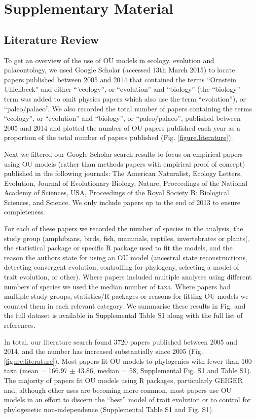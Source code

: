 \section{Supplementary Material}

  \subsection{Literature Review}
    To get an overview of the use of OU models in ecology, evolution and palaeontology, we used Google Scholar (accessed 13th March 2015) to locate papers published between 2005 \citep[when the R package ouch was released;][]{Butler:2004aa} and 2014 that contained the terms ``Ornstein Uhlenbeck'' and either ``'ecology'', or ``evolution'' and ``biology'' (the ``biology'' term was added to omit physics papers which also use the term ``evolution''), or ``paleo/palaeo''. 
    We also recorded the total number of papers containing the terms ``ecology'', or ``evolution'' and ``biology'', or ``paleo/palaeo'', published between 2005 and 2014 and plotted the number of OU papers published each year as a proportion of the total number of papers published (Fig. \ref{figure.literature}). 

    Next we filtered our Google Scholar search results to focus on empirical papers using OU models (rather than methods papers with empirical proof of concept) published in the following journals: The American Naturalist, Ecology Letters, Evolution, Journal of Evolutionary Biology, Nature, Proceedings of the National Academy of Sciences, USA, Proceedings of the Royal Society B: Biological Sciences, and Science.
    We only include papers up to the end of 2013 to ensure completeness.

    For each of these papers we recorded the number of species in the analysis, the study group (amphibians, birds, fish, mammals, reptiles, invertebrates or plants), the statistical package or specific R package used to fit the models, and the reason the authors state for using an OU model (ancestral state reconstructions, detecting convergent evolution, controlling for phylogeny, selecting a model of trait evolution, or other). 
    Where papers included multiple analyses using different numbers of species we used the median number of taxa. 
    Where papers had multiple study groups, statistics/R packages or reasons for fitting OU models we counted them in each relevant category. 
    We summarise these results in Fig. %
    and the full dataset is available in Supplemental Table S1 along with the full list of references.

    In total, our literature search found 3720 papers published between 2005 and 2014, and the number has increased substantially since 2005 (Fig. \ref{figure:literature}). 
    Most papers fit OU models to phylogenies with fewer than 100 taxa (mean = 166.97 $\pm$ 43.86, median = 58, Supplemental Fig. S1 and Table S1). 
    The majority of papers fit OU models using R packages, particularly GEIGER and, although other uses are becoming more common, most papers use OU models in an effort to discern the “best” model of trait evolution or to control for phylogenetic non-independence (Supplemental Table S1 and Fig. S1). 
 
